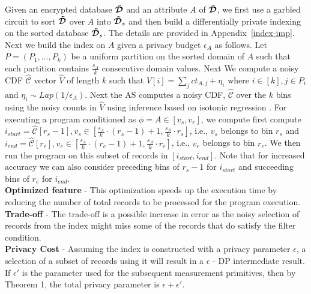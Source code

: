 Given an encrypted database $\boldsymbol{\tilde{\mathcal{D}}}$ and an attribute $A$ of $\boldsymbol{\tilde{\mathcal{D}}}$, we first use a garbled circuit to sort $\boldsymbol{\tilde{\mathcal{D}}}$ over $A$ into $\boldsymbol{\tilde{\mathcal{D}}}_s$ and then build a differentially private indexing on the sorted database $\boldsymbol{\tilde{\mathcal{D}}}_s$. The details are provided in Appendix~\ref{index-imp}. Next we build the index on $A$ given a privacy budget $\epsilon_{A}$ as follows. Let $P=(P_1,\ldots,P_k)$ be a uniform partition on the sorted domain of $A$ such that each partition contains $\frac{s_A}{k}$ consecutive domain values. Next We compute a noisy CDF $\hat{\mathcal{C}}$ vector $\hat{V}$ of length $k$ such that $\hat{V}[i]=\sum_j ct_{A,j}+\eta_i$ where $i \in [k], j \in P_i$ and $\eta_i\sim Lap(1/\epsilon_A)$. 
Next the \textsf{AS} computes a noisy CDF, $\hat{\mathcal{C}}$ over the $k$ bins using the noisy counts in $\hat{V}$ using inference based on isotonic regression \cite{cdf}. For executing a program conditioned as $\phi=A \in [v_s,v_e]$, we compute first compute $i_{start}=\hat{\mathcal{C}}[r_s-1], v_s \in [\frac{s_A}{k}\cdot(r_s-1)+1,\frac{s_A}{k}\cdot r_s]$, i.e., $v_s$ belongs to bin $r_s$   and  $i_{end}=\hat{\mathcal{C}}[r_e], v_e \in [\frac{s_A}{k}\cdot(r_e-1)+1,\frac{s_A}{k}\cdot r_e]$, i.e., $v_e$ belongs to bin $r_e$. We then run the program on this subset of records in $[i_{start},i_{end}]$. Note that for increased accuracy we can also consider preceding bins of $r_s-1$ for $i_{start}$ and succeeding bins of $r_e$ for $i_{end}$.\\
\textbf{Optimized feature} - This optimization speeds up the execution time by reducing the number of total records to be processed for the program execution.\\
\textbf{Trade-off} - The trade-off is  a possible increase in error as the noisy selection of records from the index might miss some of the records that do satisfy the filter condition.\\
\textbf{Privacy Cost} - Assuming the index is constructed with a privacy parameter $\epsilon$, a selection of a subset of records using it will result in a $\epsilon$ - DP intermediate result. If $\epsilon'$ is the parameter used for the subsequent measurement primitives, then by Theorem 1, the total privacy parameter is $\epsilon+\epsilon'$.\\
